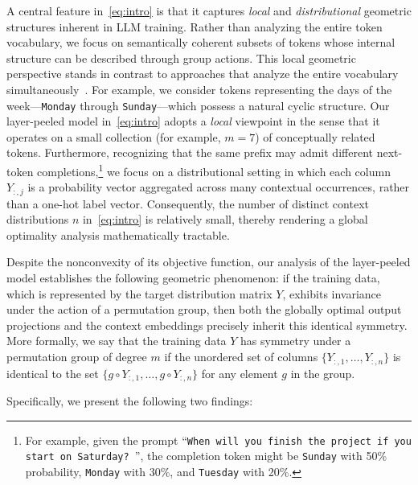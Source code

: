 \documentclass[11pt]{article}
\begin{document}
A central feature in~\cref{eq:intro} is that it captures \textit{local} and \textit{distributional} geometric structures inherent in LLM training. Rather than analyzing the entire token vocabulary, we focus on semantically coherent subsets of tokens whose internal structure can be described through group actions. This local geometric perspective stands in contrast to approaches that analyze the entire vocabulary simultaneously~\citep{zhao2024implicit}. For example, we consider tokens representing the days of the week---\texttt{Monday} through \texttt{Sunday}---which possess a natural cyclic structure. Our layer-peeled model in~\cref{eq:intro} adopts a \textit{local} viewpoint in the sense that it operates on a small collection (for example, \(m = 7\)) of conceptually related tokens. Furthermore, recognizing that the same prefix may admit different next-token completions,\footnote{For example, given the prompt ``\texttt{When will you finish the project if you start on Saturday? \textvisiblespace}'', the completion token might be \texttt{Sunday} with 50\% probability, \texttt{Monday} with 30\%, and \texttt{Tuesday} with 20\%.} we focus on a distributional setting in which each column \(Y_{:,j}\) is a probability vector aggregated across many contextual occurrences, rather than a one-hot label vector. Consequently, the number of distinct context distributions \(n\) in~\cref{eq:intro} is relatively small, thereby rendering a global optimality analysis mathematically tractable.

Despite the nonconvexity of its objective function, our analysis of the layer-peeled model establishes the following geometric phenomenon: if the training data, which is represented by the target distribution matrix $Y$, exhibits invariance under the action of a permutation group, then both the globally optimal output projections and the context embeddings precisely inherit this identical symmetry. More formally, we say that the training data \(Y\) has symmetry under a permutation group of degree $m$ if the unordered set of columns \(\{Y_{:,1}, \ldots, Y_{:,n}\}\) is identical to the set \(\{g\circ Y_{:,1}, \ldots, g\circ Y_{:,n}\}\) for any element $g$ in the group.

Specifically, we present the following two findings:
\end{document}
